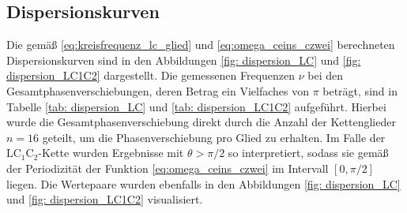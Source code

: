 \subsection{Dispersionskurven}
Die gemäß \eqref{eq:kreisfrequenz_lc_glied} und \eqref{eq:omega_ceins_czwei} berechneten Dispersionskurven sind in den Abbildungen \ref{fig: dispersion_LC} und \ref{fig: dispersion_LC1C2}
dargestellt. Die gemessenen Frequenzen $\nu$ bei den Gesamtphasenverschiebungen, deren Betrag ein Vielfaches von $\pi$ beträgt,
sind in Tabelle \ref{tab: dispersion_LC} und \ref{tab: dispersion_LC1C2} aufgeführt. Hierbei wurde die Gesamtphasenverschiebung direkt durch die
Anzahl der Kettenglieder $n = 16$ geteilt, um die Phasenverschiebung pro Glied zu erhalten. Im Falle der $\mathup{LC_1C_2}$-Kette
wurden Ergebnisse mit $\theta > \pi/2$ so interpretiert, sodass sie gemäß der Periodizität der Funktion \eqref{eq:omega_ceins_czwei} im Intervall
$[0, \pi/2]$ liegen. Die Wertepaare wurden ebenfalls in den Abbildungen \ref{fig: dispersion_LC} und \ref{fig: dispersion_LC1C2} visualisiert.



